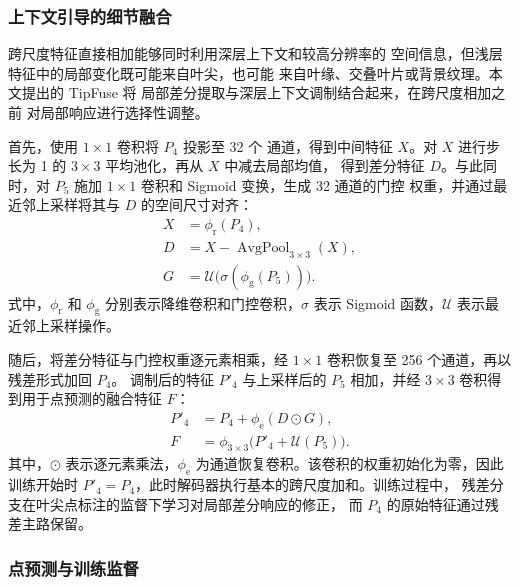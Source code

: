 \subsubsection{上下文引导的细节融合}
\label{sec:cgtipnet-tipfuse}

跨尺度特征直接相加能够同时利用深层上下文和较高分辨率的
空间信息，但浅层特征中的局部变化既可能来自叶尖，也可能
来自叶缘、交叠叶片或背景纹理。本文提出的 TipFuse 将
局部差分提取与深层上下文调制结合起来，在跨尺度相加之前
对局部响应进行选择性调整。

首先，使用 \(1\times1\) 卷积将 \(P_4\) 投影至 32 个
通道，得到中间特征 \(X\)。对 \(X\) 进行步长为 1 的
\(3\times3\) 平均池化，再从 \(X\) 中减去局部均值，
得到差分特征 \(D\)。与此同时，对 \(P_5\) 施加
\(1\times1\) 卷积和 Sigmoid 变换，生成 32 通道的门控
权重，并通过最近邻上采样将其与 \(D\) 的空间尺寸对齐：
\begin{equation}
  \begin{aligned}
    X &= \phi_{\mathrm{r}}(P_4),\\
    D &= X-\operatorname{AvgPool}_{3\times3}(X),\\
    G &= \mathcal{U}\bigl(\sigma(\phi_{\mathrm{g}}(P_5))\bigr).
  \end{aligned}
  \label{eq:cgtipnet-tipfuse-detail}
\end{equation}
式中，\(\phi_{\mathrm{r}}\) 和 \(\phi_{\mathrm{g}}\)
分别表示降维卷积和门控卷积，\(\sigma\) 表示 Sigmoid
函数，\(\mathcal{U}\) 表示最近邻上采样操作。

随后，将差分特征与门控权重逐元素相乘，经 \(1\times1\)
卷积恢复至 256 个通道，再以残差形式加回 \(P_4\)。
调制后的特征 \(P'_4\) 与上采样后的 \(P_5\) 相加，并经
\(3\times3\) 卷积得到用于点预测的融合特征 \(F\)：
\begin{equation}
  \begin{aligned}
    P'_4 &= P_4+\phi_{\mathrm{e}}(D\odot G),\\
    F &= \phi_{3\times3}\bigl(P'_4+\mathcal{U}(P_5)\bigr).
  \end{aligned}
  \label{eq:cgtipnet-tipfuse-fusion}
\end{equation}
其中，\(\odot\) 表示逐元素乘法，\(\phi_{\mathrm{e}}\)
为通道恢复卷积。该卷积的权重初始化为零，因此训练开始时
\(P'_4=P_4\)，此时解码器执行基本的跨尺度加和。训练过程中，
残差分支在叶尖点标注的监督下学习对局部差分响应的修正，
而 \(P_4\) 的原始特征通过残差主路保留。

\subsubsection{点预测与训练监督}
\label{sec:cgtipnet-point-head}

